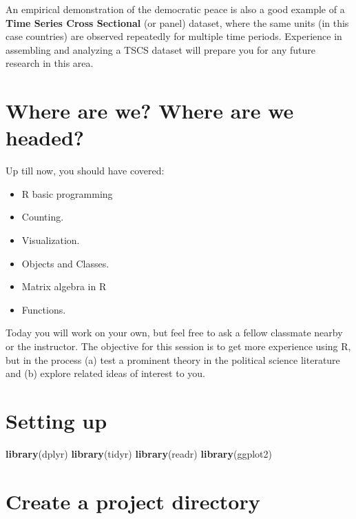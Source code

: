\documentclass[
]{book}
\newenvironment{Shaded}{\begin{snugshade}}{\end{snugshade}}
\newcommand{\KeywordTok}[1]{\textcolor[rgb]{0.13,0.29,0.53}{\textbf{#1}}}
\newcommand{\NormalTok}[1]{#1}
\providecommand{\tightlist}{%
  \setlength{\itemsep}{0pt}\setlength{\parskip}{0pt}}
\theoremstyle{definition}
\theoremstyle{definition}
\theoremstyle{definition}
\theoremstyle{remark}
\begin{document}
An empirical demonstration of the democratic peace is also a good example of a \textbf{Time Series Cross Sectional} (or panel) dataset, where the same units (in this case countries) are observed repeatedly for multiple time periods. Experience in assembling and analyzing a TSCS dataset will prepare you for any future research in this area.

\hypertarget{where-are-we-where-are-we-headed-4}{%
\section*{Where are we? Where are we headed?}\label{where-are-we-where-are-we-headed-4}}

Up till now, you should have covered:

\begin{itemize}
\tightlist
\item
  R basic programming
\item
  Counting.
\item
  Visualization.
\item
  Objects and Classes.
\item
  Matrix algebra in R
\item
  Functions.
\end{itemize}

Today you will work on your own, but feel free to ask a fellow classmate nearby or the instructor. The objective for this session is to get more experience using R, but in the process (a) test a prominent theory in the political science literature and (b) explore related ideas of interest to you.

\hypertarget{setting-up}{%
\section{Setting up}\label{setting-up}}

\begin{Shaded}
\begin{Highlighting}[]
\KeywordTok{library}\NormalTok{(dplyr)}
\KeywordTok{library}\NormalTok{(tidyr)}
\KeywordTok{library}\NormalTok{(readr)}
\KeywordTok{library}\NormalTok{(ggplot2)}
\end{Highlighting}
\end{Shaded}

\hypertarget{create-a-project-directory}{%
\section{Create a project directory}\label{create-a-project-directory}}
\end{document}
